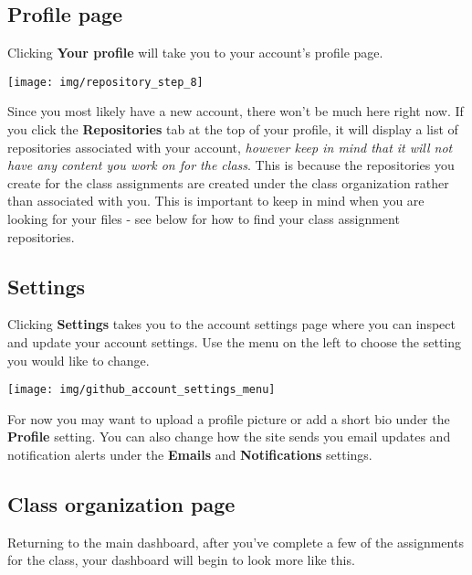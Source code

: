 \documentclass[
]{book}
\begin{document}
\hypertarget{profile-page}{%
\subsection{Profile page}\label{profile-page}}

Clicking \textbf{Your profile} will take you to your account's profile page.

\begin{center}\texttt{[image: img/repository\_step\_8]} \end{center}

Since you most likely have a new account, there won't be much here right now.
If you click the \textbf{Repositories} tab at the top of your profile, it will display a list of repositories associated with your account, \emph{however keep in mind that it will not have any content you work on for the class}.
This is because the repositories you create for the class assignments are created under the class organization rather than associated with you.
This is important to keep in mind when you are looking for your files - see below for how to find your class assignment repositories.

\hypertarget{settings}{%
\subsection{Settings}\label{settings}}

Clicking \textbf{Settings} takes you to the account settings page where you can inspect and update your account settings.
Use the menu on the left to choose the setting you would like to change.

\begin{center}\texttt{[image: img/github\_account\_settings\_menu]} \end{center}

For now you may want to upload a profile picture or add a short bio under the \textbf{Profile} setting.
You can also change how the site sends you email updates and notification alerts under the \textbf{Emails} and \textbf{Notifications} settings.

\hypertarget{class-organization-page}{%
\subsection{Class organization page}\label{class-organization-page}}

Returning to the main dashboard, after you've complete a few of the assignments for the class, your dashboard will begin to look more like this.
\end{document}
